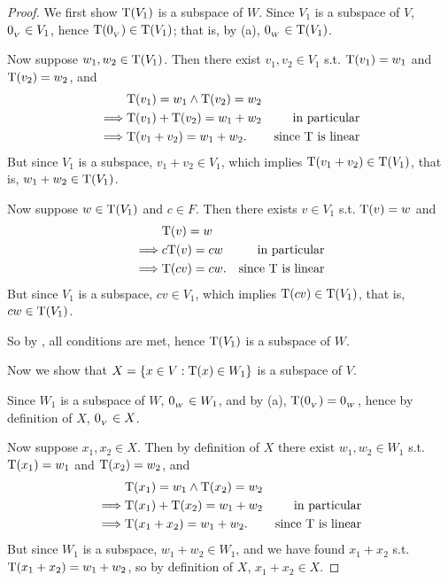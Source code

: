 \begin{proof}
We first show \(\mathrm{T}(V_1)\) is a subspace of \(W\).
Since \(V_1\) is a subspace of \(V\), \(0_{_V} \in V_1\), hence \(\mathrm{T}(0_{_V}) \in \mathrm{T}(V_1)\);
that is, by (a), \(0_{_W} \in \mathrm{T}(V_1)\).

Now suppose \(w_1, w_2 \in \mathrm{T}(V_1)\).
Then there exist \(v_1, v_2 \in V_1\) s.t. \(\mathrm{T}(v_1) = w_1\) and \(\mathrm{T}(v_2) = w_2\), and
\begin{align*}
             & \mathrm{T}(v_1) = w_1 \land \mathrm{T}(v_2) = w_2 \\
    \implies & \mathrm{T}(v_1) + \mathrm{T}(v_2) = w_1 + w_2 & \text{in particular} \\
    \implies & \mathrm{T}(v_1 + v_2) = w_1 + w_2. & \text{since \(\mathrm{T}\) is linear}
\end{align*}
But since \(V_1\) is a subspace, \(v_1 + v_2 \in V_1\), which implies \(\mathrm{T}(v_1 + v_2) \in \mathrm{T}(V_1)\), that is, \(w_1 + w_2 \in \mathrm{T}(V_1)\).

Now suppose \(w \in \mathrm{T}(V_1)\) and \(c \in F\).
Then there exists \(v \in V_1\) s.t. \(\mathrm{T}(v) = w\) and
\begin{align*}
             & \mathrm{T}(v) = w \\
    \implies & c\mathrm{T}(v) = cw & \text{in particular} \\
    \implies & \mathrm{T}(cv) = cw. & \text{since \(\mathrm{T}\) is linear}
\end{align*}
But since \(V_1\) is a subspace, \(cv \in V_1\), which implies \(\mathrm{T}(cv) \in \mathrm{T}(V_1)\), that is, \(cw \in \mathrm{T}(V_1)\).

So by , all conditions are met, hence \(\mathrm{T}(V_1)\) is a subspace of \(W\).

Now we show that \(X = \{ x \in V: \mathrm{T}(x) \in W_1 \}\) is a subspace of \(V\).

Since \(W_1\) is a subspace of \(W\), \(0_{_W} \in W_1\), and by (a), \(\mathrm{T}(0_{_V}) = 0_{_W}\), hence by definition of \(X\), \(0_{_V} \in X\).

Now suppose \(x_1, x_2 \in X\).
Then by definition of \(X\) there exist \(w_1, w_2 \in W_1\) s.t. \(\mathrm{T}(x_1) = w_1\) and \(\mathrm{T}(x_2) = w_2\), and
\begin{align*}
             & \mathrm{T}(x_1) = w_1 \land \mathrm{T}(x_2) = w_2 \\
    \implies & \mathrm{T}(x_1) + \mathrm{T}(x_2) = w_1 + w_2 & \text{in particular} \\
    \implies & \mathrm{T}(x_1 + x_2) = w_1 + w_2. & \text{since \(\mathrm{T}\) is linear}
\end{align*}
But since \(W_1\) is a subspace, \(w_1 + w_2 \in W_1\), and we have found \(x_1 + x_2\) s.t. \(\mathrm{T}(x_1 + x_2) = w_1 + w_2\), so by definition of \(X\), \(x_1 + x_2 \in X\).


\end{proof}
